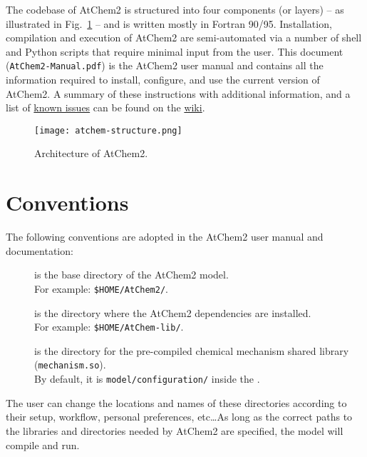 The codebase of AtChem2 is structured into four components (or layers)
-- as illustrated in Fig.~\ref{fig:atchem-arch} -- and is written
mostly in Fortran 90/95. Installation, compilation and execution of
AtChem2 are semi-automated via a number of shell and Python scripts
that require minimal input from the user. This document
(\texttt{AtChem2-Manual.pdf}) is the AtChem2 user manual and contains
all the information required to install, configure, and use the
current version of AtChem2. A summary of these instructions with
additional information, and a list of \underline{known issues} can be
found on the \href{https://github.com/AtChem/AtChem2/wiki}{wiki}.

\begin{figure}[htb]
  \centering
  \texttt{[image: atchem-structure.png]}
  \caption{Architecture of AtChem2.}
  \label{fig:atchem-arch}
\end{figure}

\section{Conventions} \label{sec:conventions}

The following conventions are adopted in the AtChem2 user manual and
documentation:

\begin{description}
\item[\maindir] is the base directory of the AtChem2 model.\\
  For example: \texttt{\$HOME/AtChem2/}.
\item[\depdir] is the directory where the AtChem2 dependencies are installed.\\
  For example: \texttt{\$HOME/AtChem-lib/}.
\item[\sharedir] is the directory for the pre-compiled chemical
  mechanism shared library (\texttt{mechanism.so}).\\
  By default, it is \texttt{model/configuration/} inside the \maindir.
\end{description}

The user can change the locations and names of these directories
according to their setup, workflow, personal preferences, etc\ldots As
long as the correct paths to the libraries and directories needed by
AtChem2 are specified, the model will compile and run.\\

